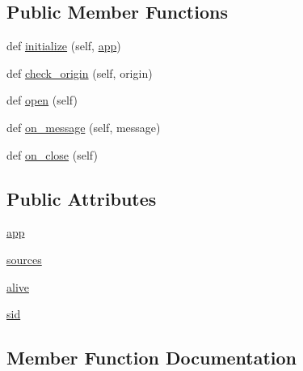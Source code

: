 \subsection*{Public Member Functions}
\begin{DoxyCompactItemize}
\item 
def \hyperlink{classparlai_1_1mturk_1_1webapp_1_1server_1_1TaskSocketHandler_ab4f73b8d0b0a7757d5e038b39b39bae5}{initialize} (self, \hyperlink{classparlai_1_1mturk_1_1webapp_1_1server_1_1TaskSocketHandler_a1e04549bbc02ca8d76b295ea2cb74a0f}{app})
\item 
def \hyperlink{classparlai_1_1mturk_1_1webapp_1_1server_1_1TaskSocketHandler_a70122a05efc4aef04aa4ecb4bd718173}{check\+\_\+origin} (self, origin)
\item 
def \hyperlink{classparlai_1_1mturk_1_1webapp_1_1server_1_1TaskSocketHandler_adb3510933e76ec5d4f7ac2d1dd52962f}{open} (self)
\item 
def \hyperlink{classparlai_1_1mturk_1_1webapp_1_1server_1_1TaskSocketHandler_a5d4b5ce22544ee8eab0063586b9e5fe8}{on\+\_\+message} (self, message)
\item 
def \hyperlink{classparlai_1_1mturk_1_1webapp_1_1server_1_1TaskSocketHandler_a9bf75a90b26ccfe8ba72a5cea8612035}{on\+\_\+close} (self)
\end{DoxyCompactItemize}
\subsection*{Public Attributes}
\begin{DoxyCompactItemize}
\item 
\hyperlink{classparlai_1_1mturk_1_1webapp_1_1server_1_1TaskSocketHandler_a1e04549bbc02ca8d76b295ea2cb74a0f}{app}
\item 
\hyperlink{classparlai_1_1mturk_1_1webapp_1_1server_1_1TaskSocketHandler_a996b255bda95ff104f6117a02874e219}{sources}
\item 
\hyperlink{classparlai_1_1mturk_1_1webapp_1_1server_1_1TaskSocketHandler_a730b42ceee91d8ce1278f60c65595a71}{alive}
\item 
\hyperlink{classparlai_1_1mturk_1_1webapp_1_1server_1_1TaskSocketHandler_a9bdd78d8eed7be817fa1e4aac0b318e7}{sid}
\end{DoxyCompactItemize}


\subsection{Member Function Documentation}
\mbox{\label{classparlai_1_1mturk_1_1webapp_1_1server_1_1TaskSocketHandler_a70122a05efc4aef04aa4ecb4bd718173}} 
